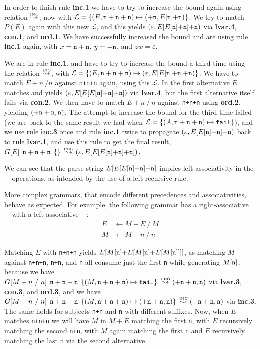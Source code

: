 In order to finish rule {\bf inc.1} we have to try to increase the
bound again using relation $\Li$, now with $\mathcal{L} = \{
(E,{\tt n+n+n}) \mapsto ({\tt +n},E[{\tt n}]{\tt +n}) \}$. We try to
match $P(E)$ again with this new $\mathcal{L}$, and this yields $(\varepsilon,
E[E[{\tt n}]{\tt +n}]{\tt +n})$ via {\bf lvar.4}, {\bf con.1}, and
{\bf ord.1}. We have successfully increased the bound and are using
rule {\bf inc.1} again, with $x = {\tt n+n}$, $y = {\tt +n}$, and $zw
= \varepsilon$. 

We are in rule {\bf inc.1}, and have to try to increase the bound a
third time using the relation $\Li$, with $\mathcal{L} = \{
(E,{\tt n+n+n}) \mapsto (\varepsilon,E[E[{\tt n}]{\tt +n}]{\tt +n})
\}$.  We have to match $E+n \ / n$ against {\tt n+n+n} again, using
this $\mathcal{L}$.
 In the first alternative $E$ matches and yields $(\varepsilon, E[E[E[{\tt n}]{\tt +n}]{\tt +n}])$
via {\bf lvar.4}, but the first alternative itself fails via {\bf
  con.2}. We then have to match $E+n \ / \ n$ against {\tt n+n+n} using {\bf
  ord.2}, yielding $({\tt +n+n},{\tt n})$. The attempt to increase the
bound for the third time failed (we are back to the same result we had
when $\mathcal{L} = \{ (A,{\tt n+n+n}) \mapsto \Nothing \}$), and we
use rule {\bf inc.3} once and rule {\bf inc.1} twice to propagate
$(\varepsilon,E[E[{\tt n}]{\tt +n}]{\tt +n})$ back to rule {\bf lvar.1}, and use this
rule to get the final result, $\Matgm{E}{{\tt n+n+n}}{\{\}} \Lp (\varepsilon,E[E[E[{\tt n}]{\tt +n}]{\tt +n}])$.

We can see that the parse string $E[E[E[{\tt n}]{\tt +n}]{\tt +n}]$ implies left-associativity in the $+$
operations, as intended by the use of a left-recursive rule.

More complex grammars, that encode different precedences and
associativities, behave as expected. For example, the following grammar
has a right-associative $+$ with a left-associative $-$:
\begin{align*}
E & \leftarrow M + E \ / \  M \\
M & \leftarrow M - n \ / \ n
\end{align*}

Matching $E$ with {\tt n+n+n} yields $E[M[{\tt n}]{\tt +}E[M[{\tt n}]{\tt +}E[M[{\tt n}]]]]$,
as matching $M$ against {\tt n+n+n}, {\tt n+n}, and {\tt n} all consume just the
first {\tt n} while generating $M[{\tt n}]$, because we have $\Matgm{M-n \ / \
  n}{{\tt n+n+n}}{\{(M, {\tt n+n+n}) \mapsto \Nothing\}} \Lp ({\tt +n+n},{\tt n})$ via {\bf
  lvar.3}, {\bf con.3}, and {\bf ord.3}, and we have $\Matgm{M-n \ / \
  n}{{\tt n+n+n}}{\{(M,{\tt n+n+n}) \mapsto ({\tt +n+n},{\tt n})\}} \Li ({\tt +n+n},{\tt n})$ via
{\bf inc.3}. The same holds for subjects {\tt n+n} and {\tt n} with
different suffixes.  Now, when $E$ matches {\tt n+n+n} we will have $M$ in
$M+E$ matching the first {\tt n}, with $E$ recursively matching the
second {\tt n+n}, with $M$ again matching the first {\tt n} and $E$
recursively matching the last {\tt n} via the second alternative.

